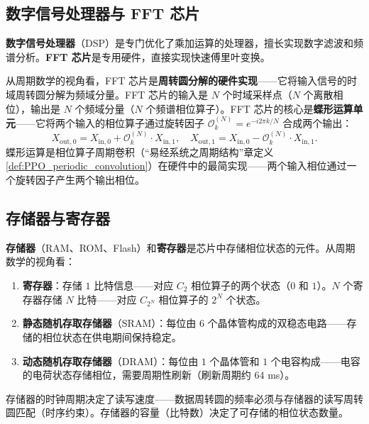 \subsection{数字信号处理器与 FFT 芯片}

\begin{definition}\label{def:dsp_fft}
\textbf{数字信号处理器}（DSP）是专门优化了乘加运算的处理器，擅长实现数字滤波和频谱分析。\textbf{FFT 芯片}是专用硬件，直接实现快速傅里叶变换。

从周期数学的视角看，FFT 芯片是\textbf{周转圆分解的硬件实现}——它将输入信号的时域周转圆分解为频域分量。FFT 芯片的输入是 $N$ 个时域采样点（$N$ 个离散相位），输出是 $N$ 个频域分量（$N$ 个频谱相位算子）。FFT 芯片的核心是\textbf{蝶形运算单元}——它将两个输入的相位算子通过旋转因子 $\mathcal{O}_k^{(N)} = e^{-i2\pi k/N}$ 合成两个输出：
\[
X_{\text{out},0} = X_{\text{in},0} + \mathcal{O}_k^{(N)} \cdot X_{\text{in},1}, \quad X_{\text{out},1} = X_{\text{in},0} - \mathcal{O}_k^{(N)} \cdot X_{\text{in},1}.
\]
蝶形运算是相位算子周期卷积（“易经系统之周期结构”章定义 \ref{def:PPO_periodic_convolution}）在硬件中的最简实现——两个输入相位通过一个旋转因子产生两个输出相位。
\end{definition}

\subsection{存储器与寄存器}

\begin{definition}[存储器的周转圆解释]\label{def:memory_epicycle}
\textbf{存储器}（RAM、ROM、Flash）和\textbf{寄存器}是芯片中存储相位状态的元件。从周期数学的视角看：
\begin{enumerate}[label=(\roman*)]
    \item \textbf{寄存器}：存储 $1$ 比特信息——对应 $C_2$ 相位算子的两个状态（$0$ 和 $1$）。$N$ 个寄存器存储 $N$ 比特——对应 $C_{2^N}$ 相位算子的 $2^N$ 个状态。
    \item \textbf{静态随机存取存储器}（SRAM）：每位由 $6$ 个晶体管构成的双稳态电路——存储的相位状态在供电期间保持稳定。
    \item \textbf{动态随机存取存储器}（DRAM）：每位由 $1$ 个晶体管和 $1$ 个电容构成——电容的电荷状态存储相位，需要周期性刷新（刷新周期约 $64$ ms）。
\end{enumerate}
存储器的时钟周期决定了读写速度——数据周转圆的频率必须与存储器的读写周转圆匹配（时序约束）。存储器的容量（比特数）决定了可存储的相位状态数量。
\end{definition}


